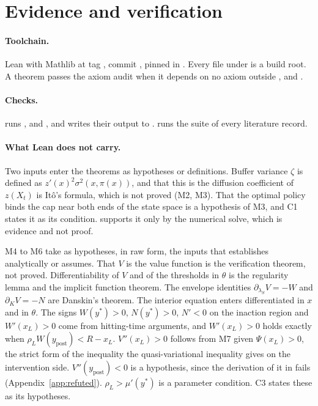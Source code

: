 \section{Evidence and verification}
\label{app:evidence}

\paragraph{Toolchain.} Lean  with Mathlib at tag
, commit , pinned in . Every file under
 is a build root. A theorem passes the axiom audit when it
depends on no axiom outside ,  and
.

\paragraph{Checks.}  runs ,
 and , and
writes their output to .
 runs the suite of every literature record.

\paragraph{What Lean does not carry.} Two inputs enter the theorems as
hypotheses or definitions. Buffer variance $\zeta$ is defined as
$z'(x)^2\sigma^2(x,\pi(x))$, and that this is the diffusion coefficient of
$z(X_t)$ is Itô's formula, which is not proved (M2, M3). That the optimal
policy binds the cap near both ends of the state space is a hypothesis of M3,
and C1 states it as its condition.  supports it only by
the numerical solve, which is evidence and not proof.

M4 to M6 take as hypotheses, in raw form, the inputs that
 establishes analytically or assumes. That $V$ is the
value function is the verification theorem, not proved. Differentiability of
$V$ and of the thresholds in $\theta$ is the regularity lemma and the implicit
function theorem. The envelope identities $\partial_{\lambda_S}V=-W$ and
$\partial_KV=-N$ are Danskin's theorem. The interior equation enters
differentiated in $x$ and in $\theta$. The signs $W(y^*)>0$, $N(y^*)>0$,
$N'<0$ on the inaction region and $W'(x_L)>0$ come from hitting-time
arguments, and $W'(x_L)>0$ holds exactly when $\rho_LW(y_{\text{post}})<R-x_L$.
$V''(x_L)>0$ follows from M7 given $\Psi(x_L)>0$, the strict form of the
inequality the quasi-variational inequality gives on the intervention side.
$V''(y_{\text{post}})<0$ is a hypothesis, since the derivation of it in
 fails (Appendix~\ref{app:refuted}). $\rho_L>\mu'(y^*)$ is a parameter condition. C3 states these
as its hypotheses.

